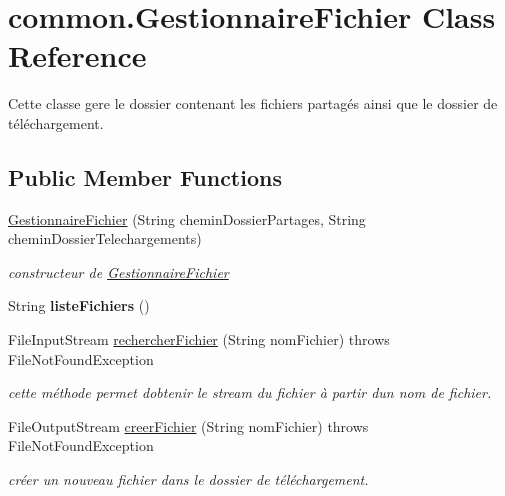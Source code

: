 \hypertarget{classcommon_1_1GestionnaireFichier}{}\section{common.\+Gestionnaire\+Fichier Class Reference}
\label{classcommon_1_1GestionnaireFichier}


Cette classe gere le dossier contenant les fichiers partagés ainsi que le dossier de téléchargement.  


\subsection*{Public Member Functions}
\begin{DoxyCompactItemize}
\item 
\hyperlink{classcommon_1_1GestionnaireFichier_af063deb28fa952a2d0c605bc26659b16}{Gestionnaire\+Fichier} (String chemin\+Dossier\+Partages, String chemin\+Dossier\+Telechargements)
\begin{DoxyCompactList}\small\item\em constructeur de \hyperlink{classcommon_1_1GestionnaireFichier}{Gestionnaire\+Fichier} \end{DoxyCompactList}\item 
\mbox{\label{classcommon_1_1GestionnaireFichier_a7189336732591523f7490df6a16cae34}} 
String {\bfseries liste\+Fichiers} ()
\item 
File\+Input\+Stream \hyperlink{classcommon_1_1GestionnaireFichier_a55da4571d743ce9ee31a96bd04de9aa4}{rechercher\+Fichier} (String nom\+Fichier)  throws File\+Not\+Found\+Exception 
\begin{DoxyCompactList}\small\item\em cette méthode permet d\textquotesingle{}obtenir le stream du fichier à partir d\textquotesingle{}un nom de fichier. \end{DoxyCompactList}\item 
File\+Output\+Stream \hyperlink{classcommon_1_1GestionnaireFichier_a7aa94ceed1766208e16cd4d3ce8465b7}{creer\+Fichier} (String nom\+Fichier)  throws File\+Not\+Found\+Exception 
\begin{DoxyCompactList}\small\item\em créer un nouveau fichier dans le dossier de téléchargement. \end{DoxyCompactList}\item 

\end{DoxyCompactItemize}
